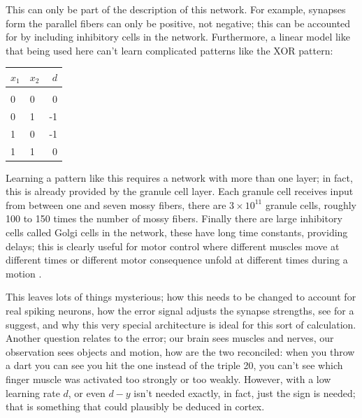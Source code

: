 \documentclass[11pt,a4paper]{scrartcl}
\begin{document}
This can only be part of the description of this network. For example,
synapses form the parallel fibers can only be positive, not negative;
this can be accounted for by including inhibitory cells in the
network. Furthermore, a linear model like that being used here can't
learn complicated patterns like the XOR pattern:
\begin{center}
\begin{tabular}{llr}
$x_1$&$x_2$&$d$\\
\hline\\
0&0&0\\
0&1&-1\\
1&0&-1\\
1&1&0
\end{tabular}
\end{center}
Learning a pattern like this requires a network with more than one
layer; in fact, this is already provided by the granule cell
layer. Each granule cell receives input from between one and seven
mossy fibers, there are $3\times 10^{11}$ granule cells, roughly 100
to 150 times the number of mossy fibers. Finally there are large
inhibitory cells called Golgi cells in the network, these have long
time constants, providing delays; this is clearly useful for motor
control where different muscles move at different times or different
motor consequence unfold at different times during a motion
\cite{Fujita1982a,ShidaraEtAl1993a}.

This leaves lots of things mysterious; how this needs to be changed to
account for real spiking neurons, how the error signal adjusts the
synapse strengths, see \cite{Houghton2014a} for a suggest, and why
this very special architecture is ideal for this sort of
calculation. Another question relates to the error; our brain sees
muscles and nerves, our observation sees objects and motion, how are
the two reconciled: when you throw a dart you can see you hit the one
instead of the triple 20, you can't see which finger muscle was
activated too strongly or too weakly. However, with a low learning
rate $d$, or even $d-y$ isn't needed exactly, in fact, just the sign
is needed; that is something that could plausibly be deduced in
cortex.
\end{document}
